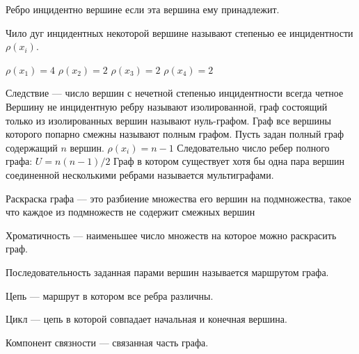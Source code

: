 \documentclass{article}
\begin{document}
Ребро инцидентно вершине если эта вершина ему принадлежит.

Чило дуг инцидентных некоторой вершине называют степенью ее инцидентности $\rho(x_i)$.

$\rho(x_1)=4$
$\rho(x_2)=2$
$\rho(x_3)=2$
$\rho(x_4)=2$

Следствие --- число вершин с нечетной степенью инцидентности всегда четное
Вершину не инцидентную ребру называют изолированной, граф состоящий только из изолированных вершин называют нуль-графом.
Граф все вершины которого попарно смежны называют полным графом.
Пусть задан полный граф содержащий $n$ вершин.
$\rho(x_i)=n-1$
Следовательно число ребер полного графа:
$U = n(n-1)/2$
Граф в котором существует хотя бы одна пара вершин соединенной несколькими ребрами называется мультиграфами.

Раскраска графа --- это разбиение множества его вершин на подмножества, такое что каждое из подмножеств не содержит смежных вершин

Хроматичность --- наименьшее число множеств на которое можно раскрасить граф.

Последовательность заданная парами вершин называется маршрутом графа.

Цепь --- маршрут в котором все ребра различны.

Цикл --- цепь в которой совпадает начальная и конечная вершина.

Компонент связности --- связанная часть графа.
\end{document}
